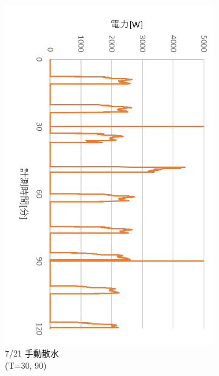 \documentclass[a4j,fleqn,dvipdfmx,uplatex]{jsarticle}
\begin{document}
\begin{figure}[htb]
\begin{subfigure}[t]{0.32\linewidth}
    \includegraphics[width=\linewidth]{img/0721_power.png}
    \caption{7/21 手動散水\\(T=30, 90)}\label{fig:d}
  \end{subfigure}
  \begin{subfigure}[t]{0.32\linewidth}
    \centering

\end{subfigure}
\end{figure}
\end{document}
